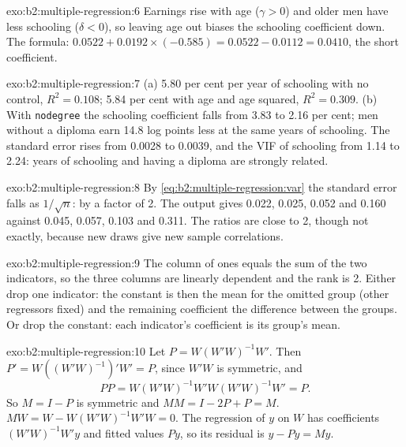 \begin{solution}{exo:b2:multiple-regression:6}
Earnings rise with age ($\gamma > 0$) and older men have less schooling ($\delta < 0$), so leaving age out biases the
schooling coefficient down. The formula: $0.0522 + 0.0192 \times (-0.585) = 0.0522 - 0.0112 = 0.0410$, the short
coefficient.
\end{solution}

\begin{solution}{exo:b2:multiple-regression:7}
(a) 5.80 per cent per year of schooling with no control, $R^2 = 0.108$; 5.84 per cent with age and age squared,
$R^2 = 0.309$. (b) With \texttt{nodegree} the schooling coefficient falls from 3.83 to 2.16 per cent; men without a
diploma earn 14.8 log points less at the same years of schooling. The standard error rises from 0.0028 to 0.0039, and the
VIF of schooling from 1.14 to 2.24: years of schooling and having a diploma are strongly related.
\end{solution}

\begin{solution}{exo:b2:multiple-regression:8}
By \eqref{eq:b2:multiple-regression:var} the standard error falls as $1/\sqrt n$: by a factor of 2. The output gives 0.022,
0.025, 0.052 and 0.160 against 0.045, 0.057, 0.103 and 0.311. The ratios are close to 2, though not exactly, because new
draws give new sample correlations.
\end{solution}

\begin{solution}{exo:b2:multiple-regression:9}
The column of ones equals the sum of the two indicators, so the three columns are linearly dependent and the rank is 2.
Either drop one indicator: the constant is then the mean for the omitted group (other regressors fixed) and the remaining
coefficient the difference between the groups. Or drop the constant: each indicator's coefficient is its group's mean.
\end{solution}

\begin{solution}{exo:b2:multiple-regression:10}
Let $P = W(W'W)^{-1}W'$. Then $P' = W((W'W)^{-1})'W' = P$, since $W'W$ is symmetric, and
\[PP = W(W'W)^{-1}W'W(W'W)^{-1}W' = P.\]
So
$M = I - P$ is symmetric and $MM = I - 2P + P = M$. $MW = W - W(W'W)^{-1}W'W = 0$. The regression of $y$ on $W$ has
coefficients $(W'W)^{-1}W'y$ and fitted values $Py$, so its residual is $y - Py = My$.
\end{solution}

